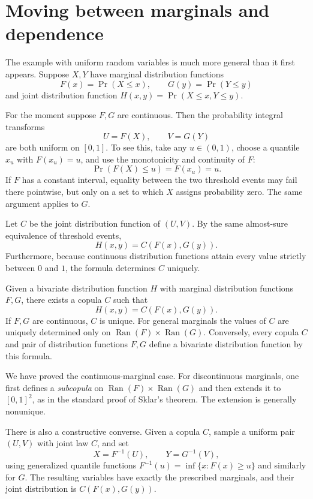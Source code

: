 \section{Moving between marginals and dependence}

The example with uniform random variables is much more general than it first appears. Suppose \(X,Y\) have marginal distribution functions
\[
 F(x)=\Pr(X\leq x),\qquad
 G(y)=\Pr(Y\leq y)
\]
and joint distribution function \(H(x,y)=\Pr(X\leq x,Y\leq y)\).

For the moment suppose \(F,G\) are continuous. Then the probability integral transforms
\[
 U=F(X),\qquad V=G(Y)
\]
are both uniform on \([0,1]\). To see this, take any \(u\in(0,1)\), choose a quantile \(x_u\) with \(F(x_u)=u\), and use the monotonicity and continuity of \(F\):
\[
 \Pr(F(X)\leq u)=F(x_u)=u.
\]
If \(F\) has a constant interval, equality between the two threshold events may fail there pointwise, but only on a set to which \(X\) assigns probability zero. The same argument applies to \(G\).

Let \(C\) be the joint distribution function of \((U,V)\). By the same almost-sure equivalence of threshold events,
\begin{equation}
 H(x,y)=C(F(x),G(y)).
 \label{eq:N20261105-Sklar}
\end{equation}
Furthermore, because continuous distribution functions attain every value strictly between \(0\) and \(1\), the formula determines \(C\) uniquely.

\begin{theorem}
Given a bivariate distribution function \(H\) with marginal distribution functions \(F,G\), there exists a copula \(C\) such that
\[
 H(x,y)=C(F(x),G(y)).
\]
If \(F,G\) are continuous, \(C\) is unique. For general marginals the values of \(C\) are uniquely determined only on \(\operatorname{Ran}(F)\times\operatorname{Ran}(G)\). Conversely, every copula \(C\) and pair of distribution functions \(F,G\) define a bivariate distribution function by this formula.
\end{theorem}

We have proved the continuous-marginal case. For discontinuous marginals, one first defines a \emph{subcopula} on \(\operatorname{Ran}(F)\times\operatorname{Ran}(G)\) and then extends it to \([0,1]^2\), as in the standard proof of Sklar's theorem. The extension is generally nonunique.

There is also a constructive converse. Given a copula \(C\), sample a uniform pair \((U,V)\) with joint law \(C\), and set
\[
 X=F^{-1}(U),\qquad Y=G^{-1}(V),
\]
using generalized quantile functions \(F^{-1}(u)=\inf\{x:F(x)\geq u\}\) and similarly for \(G\). The resulting variables have exactly the prescribed marginals, and their joint distribution is \(C(F(x),G(y))\).

